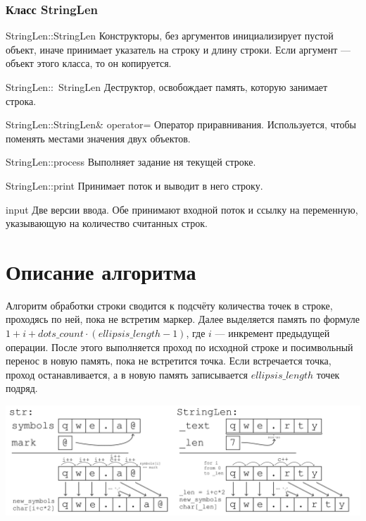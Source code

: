 \documentclass[12pt,a4paper]{extarticle}
\begin{document}
\subsubsection{Класс StringLen}
\begin{listed}
    \item StringLen::StringLen \newline
    Конструкторы, без аргументов инициализирует пустой объект, иначе принимает указатель на строку и длину строки.
    Если аргумент --- объект этого класса, то он копируется.
    \item StringLen::~StringLen \newline
    Деструктор, освобождает память, которую занимает строка.
    \item StringLen::StringLen\& operator= \newline
    Оператор приравнивания. Используется, чтобы поменять местами значения двух объектов.
    \item StringLen::process \newline
    Выполняет задание ня текущей строке.
    \item StringLen::print \newline
    Принимает поток и выводит в него строку.
    \item input \newline
    Две версии ввода. Обе принимают входной поток и ссылку на переменную, указывающую на количество считанных
    строк.
\end{listed}

\section{Описание алгоритма}
Алгоритм обработки строки сводится к подсчёту количества точек в строке, проходясь по ней, пока не встретим
маркер. Далее выделяется память по формуле $1 + i + dots\_count\cdot(ellipsis\_length - 1)$, где $i$ --- инкремент
предыдущей операции. После этого выполняется проход по исходной строке и посимвольный перенос в новую память, пока
не встретится точка. Если встречается точка, проход останавливается, а в новую память записывается $ellipsis\_length$
точек подряд.

{\centering\includegraphics[width=\linewidth]{figures/Frame 11.png}}
\end{document}
